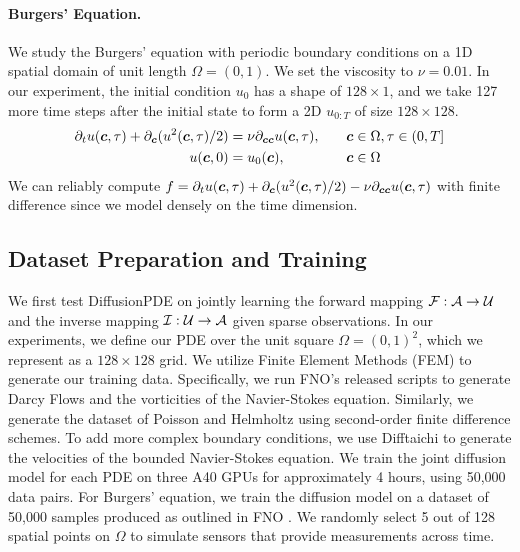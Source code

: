 \vspace{-1em}
\paragraph{Burgers' Equation.} We study the Burgers' equation with periodic boundary conditions on a 1D spatial domain of unit length $\Omega=(0, 1)$. We set the viscosity to $\nu=0.01$. In our experiment, the initial condition $u_0$ has a shape of $128\times 1$, and we take 127 more time steps after the initial state to form a 2D $u_{0:T}$ of size $128\times 128$.
\begin{equation}
    \begin{aligned}\partial_tu(\boldsymbol{c}, \tau)+\partial_{\boldsymbol{c}}(u^2(\boldsymbol{c}, \tau)/2)&=\nu\partial_{\boldsymbol{c}\boldsymbol{c}}u(\boldsymbol{c}, \tau),\quad &&\boldsymbol{c}\in\Omega,\tau\in(0,T]\\u(\boldsymbol{c},0)&=u_0(\boldsymbol{c}),&&\boldsymbol{c}\in\Omega\end{aligned}
\end{equation}
We can reliably compute  $f=\partial_tu(\boldsymbol{c}, \tau)+\partial_{\boldsymbol{c}}(u^2(\boldsymbol{c}, \tau)/2)-\nu\partial_{\boldsymbol{c}\boldsymbol{c}}u(\boldsymbol{c}, \tau)$ with finite difference since we model densely on the time dimension.

\vspace{-0.5em}
\subsection{Dataset Preparation and  Training}\label{sec:preparation}

We first test DiffusionPDE on jointly learning the forward mapping $\mathcal{F}: \mathcal{A}\to\mathcal{U}$ and the inverse mapping $\mathcal{I}: \mathcal{U}\to\mathcal{A}$ given sparse observations. In our experiments, we define our PDE over the unit square $\Omega = (0,1)^2$, which we represent as a $128\times 128$ grid. We utilize Finite Element Methods (FEM) to generate our training data. Specifically, we run FNO's \cite{li2020fourier} released scripts to generate Darcy Flows and the vorticities of the Navier-Stokes equation. Similarly, we generate the dataset of Poisson and Helmholtz using second-order finite difference schemes. To add more complex boundary conditions, we use Difftaichi \cite{hu2019difftaichi} to generate the velocities of the bounded Navier-Stokes equation. We train the joint diffusion model for each PDE on three A40 GPUs for approximately 4 hours, using 50,000 data pairs. For Burgers' equation, we train the diffusion model on a dataset of 50,000 samples produced as outlined in FNO \cite{li2020fourier}. We randomly select 5 out of 128 spatial points on $\Omega$ to simulate sensors that provide measurements across time.



